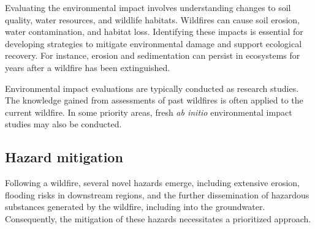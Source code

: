 \documentclass[
  12 pt,
]{Nemilov}
\begin{document}
Evaluating the environmental impact involves understanding changes to soil quality, water resources, and wildlife habitats. Wildfires can cause soil erosion, water contamination, and habitat loss. Identifying these impacts is essential for developing strategies to mitigate environmental damage and support ecological recovery. For instance, erosion and sedimentation can persist in ecosystems for years after a wildfire has been extinguished.

Environmental impact evaluations are typically conducted as research studies. The knowledge gained from assessments of past wildfires is often applied to the current wildfire. In some priority areas, fresh \emph{ab initio} environmental impact studies may also be conducted.

\subsection{Hazard mitigation}\label{hazard-mitigation}

Following a wildfire, several novel hazards emerge, including extensive erosion, flooding risks in downstream regions, and the further dissemination of hazardous substances generated by the wildfire, including into the groundwater. Consequently, the mitigation of these hazards necessitates a prioritized approach.
\end{document}
